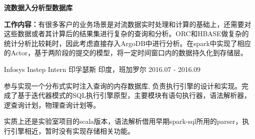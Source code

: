 \begin{cventries}
    \cventry
    {\textbf{流数据入分析型数据库}}{}{}{}
    {
        \begin{cvitems}
          \item {\textbf{工作内容：}有很多客户的业务场景是对流数据实时处理和计算的基础上，还需要对这些数据或者其计算后的结果集进行复杂的查询和分析。ORC和HBASE做复杂的统计分析比较耗时，因此考虑直接存入ArgoDB中进行分析。在spark中实现了相应的Actor，基于两阶段的提交的模型，将一定时间窗口内的数据持久化到存储层。\\[10pt]}
        \end{cvitems}
    }

\end{cventries}

\begin{cventries}
  \cventry
    {Infosys Instep Intern}
    {印孚瑟斯}
    {印度，班加罗尔}
    {2016.07 - 2016.09}
    {
      \begin{cvitems}
        \item {参与实现一个分布式实时注入查询的内存数据库, 负责执行引擎的设计和实现。完成了基于迭代器模式的SQL执行引擎原型，主要模块有语句执行器，语法解析器，逻查询计划，物理查询计划等。}
	    \item {实质上还是实验室项目的scala版本，语法解析借用早期spark-sql所用的parser，执行引擎相近，暂时没有实现存储相关功能。}
      \end{cvitems}
    }
\end{cventries}


